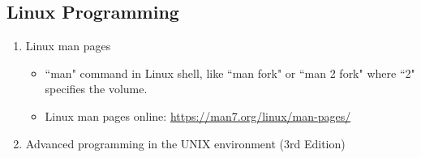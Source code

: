 \documentclass{article}
\begin{document}
\subsection{Linux Programming}
\begin{enumerate}
    \item Linux man pages
    \begin{itemize}
        \item ``man" command in Linux shell, like ``man fork" or ``man 2 fork" where ``2" specifies the volume.
        \item Linux man pages online:
        \href{https://man7.org/linux/man-pages/}{https://man7.org/linux/man-pages/}
    \end{itemize}
    \item Advanced programming in the UNIX environment (3rd Edition) \cite{stevens1992advanced}
\end{enumerate}
\end{document}
